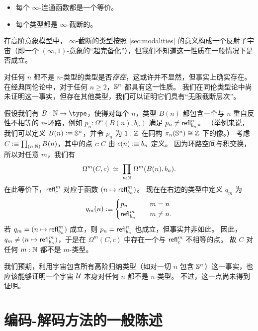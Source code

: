 \begin{itemize}
\item 每个 $\infty$-连通函数都是一个等价。
\item 每个类型都是 $\infty$-截断的。
\end{itemize}

在高阶意象模型中，
%
$\infty$-截断的类型按照 \cref{sec:modalities} 的意义构成一个反射子宇宙（即一个 $(\infty,1)$-意象的“超完备化”），但我们不知道这一性质在一般情况下是否成立。

%
%

对任何 $n$ 都不是 $n$-类型的类型是否\emph{存在}，这或许并不显然，但事实上确实存在。
在经典同伦论中，对于任何 $n\ge 2$，$\mathbb{S}^n$ 都具有这一性质。
我们在同伦类型论中尚未证明这一事实，但存在其他类型，我们可以证明它们具有“无限截断层次”。

\begin{eg}
  假设我们有 $B:\nat\to\type$，使得对每个 $n$，类型 $B(n)$ 都包含一个与 $n$ 重自反性不相等的 $n$-环路，例如 $p_n:\Omega^n(B(n),b_n)$ 满足 $p_n \neq \mathsf{refl}_{b_n}^n$。
  （举例来说，我们可以定义 $B(n)\vcentcolon\equiv \mathbb{S}^n$，并令 $p_n$ 为 $1:\mathbb{Z}$ 在同构 $\pi_n(\mathbb{S}^n)\cong \mathbb{Z}$ 下的像。）
  考虑 $C\defeq \prd{n:\nat} B(n)$，其中的点 $c:C$ 由 $c(n)\vcentcolon\equiv b_n$ 定义。
  因为环路空间与积交换，所以对任意 $m$，我们有
  \[\eqvspaced{\Omega^m (C,c)}{\prd{n:\nat}\Omega^m(B(n),b_n)}.\]
  在此等价下，$\mathsf{refl}_{c}^m$ 对应于函数 $(n\mapsto \mathsf{refl}_{b_n}^m)$。
  现在在右边的类型中定义 $q_m$ 为
  \[ q_m(n) \vcentcolon\equiv
  \begin{cases}
    p_n &\quad m=n\\
    \mathsf{refl}_{b_n}^m &\quad m\neq n.
  \end{cases}
  \]
  若 $q_m = (n\mapsto \mathsf{refl}_{b_n}^m)$ 成立，则 $p_n = \mathsf{refl}_{b_n}^n$ 也成立，但事实并非如此。
  因此，$q_m \neq (n\mapsto \mathsf{refl}_{b_n}^m)$，于是在 $\Omega^m(C,c)$ 中存在一个与 $\mathsf{refl}_{c}^m$ 不相等的点。
  故 $C$ 对任何 $m:\mathbb{N}$ 都不是 $m$-类型。
\end{eg}

我们预期，利用宇宙包含所有高阶归纳类型（如对一切 $n$ 包含 $\mathbb{S}^n$）这一事实，也应该能够证明一个宇宙 $\mathcal{U}$ 本身对任何 $n$ 都不是 $n$-类型。
不过，这一点尚未得到证明。

\section{编码-解码方法的一般陈述}
\label{sec:general-encode-decode}

